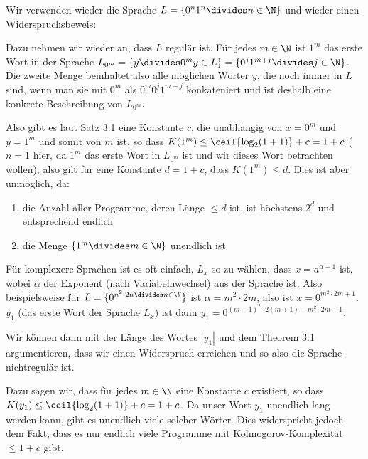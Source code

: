 \numberingOff
\inlineex Wir verwenden wieder die Sprache $L = \{ 0^n 1^n \divides n \in \N \}$ und wieder einen Widerspruchsbeweis:

Dazu nehmen wir wieder an, dass $L$ regulär ist. Für jedes $m \in \N$ ist $1^m$ das erste Wort in der Sprache $L_{0^m} = \{ y \divides 0^m y \in L \} = \{ 0^j 1^{m + j} \divides j \in \N \}$.
Die zweite Menge beinhaltet also alle möglichen Wörter $y$, die noch immer in $L$ sind, wenn man sie mit $0^m$ als $0^m 0^j 1^{m + j}$ konkateniert
und ist deshalb eine konkrete Beschreibung von $L_{0^m}$.

Also gibt es laut Satz 3.1 eine Konstante $c$, die unabhängig von $x = 0^m$ und $y = 1^m$ und somit von $m$ ist, so dass $K(1^m) \leq \ceil{\log_2(1 + 1)} + c = 1 + c$
($n = 1$ hier, da $1^m$ das erste Wort in $L_{0^m}$ ist und wir dieses Wort betrachten wollen),
also gilt für eine Konstante $d = 1 + c$, dass $K(1^m) \leq d$.
Dies ist aber unmöglich, da:
\begin{enumerate}[label=(\roman*)]
    \item die Anzahl aller Programme, deren Länge $\leq d$ ist, ist höchstens $2^d$ und entsprechend endlich
    \item die Menge $\{ 1^m \divides m \in \N \}$ unendlich ist
\end{enumerate}

Für komplexere Sprachen ist es oft einfach, $L_x$ so zu wählen, dass $x = a^{\alpha + 1}$ ist, wobei $\alpha$ der Exponent (nach Variabelnwechsel) aus der Sprache ist.
Also beispielsweise für $L = \{ 0^{n^2 \cdot 2n \divides n \in \N }\}$ ist $\alpha = m^2 \cdot 2m$, also ist $x = 0^{m^2 \cdot 2m + 1}$.
$y_1$ (das erste Wort der Sprache $L_x$) ist dann $y_1 = 0^{(m + 1)^2 \cdot 2(m + 1) - m^2 \cdot 2m + 1}$.

Wir können dann mit der Länge des Wortes $|y_1|$ und dem Theorem 3.1 argumentieren, dass wir einen Widerspruch erreichen und so also die Sprache nichtregulär ist.

Dazu sagen wir, dass für jedes $m \in \N$ eine Konstante $c$ existiert, so dass $K(y_1) \leq \ceil{\log_2(1 + 1)} + c = 1 + c$.
Da unser Wort $y_1$ unendlich lang werden kann, gibt es unendlich viele solcher Wörter. 
Dies widerspricht jedoch dem Fakt, dass es nur endlich viele Programme mit Kolmogorov-Komplexität $\leq 1 + c$ gibt.

\numberingOn
